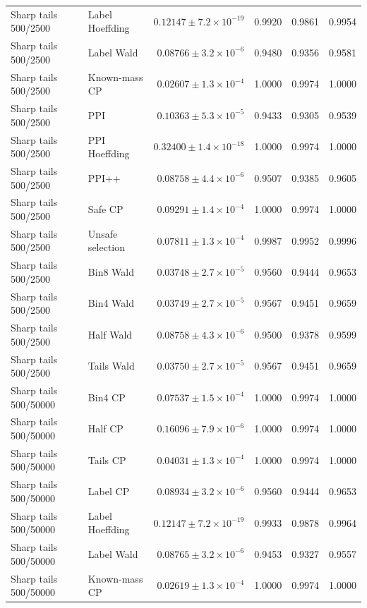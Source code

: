 \begin{longtable}{llrrrr}
Sharp tails 500/2500 & Label Hoeffding & $0.12147\pm 7.2\times 10^{-19}$ & 0.9920 & 0.9861 & 0.9954 \\
Sharp tails 500/2500 & Label Wald & $0.08766\pm 3.2\times 10^{-6}$ & 0.9480 & 0.9356 & 0.9581 \\
Sharp tails 500/2500 & Known-mass CP & $0.02607\pm 1.3\times 10^{-4}$ & 1.0000 & 0.9974 & 1.0000 \\
Sharp tails 500/2500 & PPI & $0.10363\pm 5.3\times 10^{-5}$ & 0.9433 & 0.9305 & 0.9539 \\
Sharp tails 500/2500 & PPI Hoeffding & $0.32400\pm 1.4\times 10^{-18}$ & 1.0000 & 0.9974 & 1.0000 \\
Sharp tails 500/2500 & PPI++ & $0.08758\pm 4.4\times 10^{-6}$ & 0.9507 & 0.9385 & 0.9605 \\
Sharp tails 500/2500 & Safe CP & $0.09291\pm 1.4\times 10^{-4}$ & 1.0000 & 0.9974 & 1.0000 \\
Sharp tails 500/2500 & Unsafe selection & $0.07811\pm 1.3\times 10^{-4}$ & 0.9987 & 0.9952 & 0.9996 \\
Sharp tails 500/2500 & Bin8 Wald & $0.03748\pm 2.7\times 10^{-5}$ & 0.9560 & 0.9444 & 0.9653 \\
Sharp tails 500/2500 & Bin4 Wald & $0.03749\pm 2.7\times 10^{-5}$ & 0.9567 & 0.9451 & 0.9659 \\
Sharp tails 500/2500 & Half Wald & $0.08758\pm 4.3\times 10^{-6}$ & 0.9500 & 0.9378 & 0.9599 \\
Sharp tails 500/2500 & Tails Wald & $0.03750\pm 2.7\times 10^{-5}$ & 0.9567 & 0.9451 & 0.9659 \\
Sharp tails 500/50000 & Bin4 CP & $0.07537\pm 1.5\times 10^{-4}$ & 1.0000 & 0.9974 & 1.0000 \\
Sharp tails 500/50000 & Half CP & $0.16096\pm 7.9\times 10^{-6}$ & 1.0000 & 0.9974 & 1.0000 \\
Sharp tails 500/50000 & Tails CP & $0.04031\pm 1.3\times 10^{-4}$ & 1.0000 & 0.9974 & 1.0000 \\
Sharp tails 500/50000 & Label CP & $0.08934\pm 3.2\times 10^{-6}$ & 0.9560 & 0.9444 & 0.9653 \\
Sharp tails 500/50000 & Label Hoeffding & $0.12147\pm 7.2\times 10^{-19}$ & 0.9933 & 0.9878 & 0.9964 \\
Sharp tails 500/50000 & Label Wald & $0.08765\pm 3.2\times 10^{-6}$ & 0.9453 & 0.9327 & 0.9557 \\
Sharp tails 500/50000 & Known-mass CP & $0.02619\pm 1.3\times 10^{-4}$ & 1.0000 & 0.9974 & 1.0000 \\

\end{longtable}

